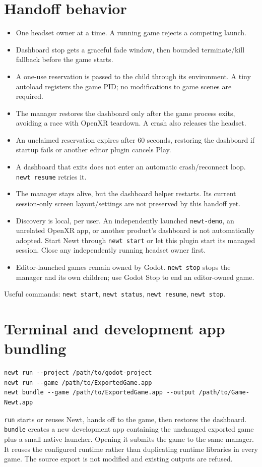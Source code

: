 \documentclass[11pt]{article}
\begin{document}
\section{Handoff behavior}
\label{sec:orgc7f6d77}
\begin{itemize}
\item One headset owner at a time. A running game rejects a competing launch.
\item Dashboard stop gets a graceful fade window, then bounded terminate/kill fallback before the game starts.
\item A one-use reservation is passed to the child through its environment. A tiny autoload registers the game PID; no modifications to game scenes are required.
\item The manager restores the dashboard only after the game process exits, avoiding a race with OpenXR teardown. A crash also releases the headset.
\item An unclaimed reservation expires after 60 seconds, restoring the dashboard if startup fails or another editor plugin cancels Play.
\item A dashboard that exits does not enter an automatic crash/reconnect loop. \texttt{newt resume} retries it.
\item The manager stays alive, but the dashboard helper restarts. Its current session-only screen layout/settings are not preserved by this handoff yet.
\item Discovery is local, per user. An independently launched \texttt{newt-demo}, an unrelated OpenXR app, or another product's dashboard is not automatically adopted. Start Newt through \texttt{newt start} or let this plugin start its managed session. Close any independently running headset owner first.
\item Editor-launched games remain owned by Godot. \texttt{newt stop} stops the manager and its own children; use Godot Stop to end an editor-owned game.
\end{itemize}

Useful commands: \texttt{newt start}, \texttt{newt status}, \texttt{newt resume}, \texttt{newt stop}.
\section{Terminal and development app bundling}
\label{sec:org80abfc4}
\begin{verbatim}
newt run --project /path/to/godot-project
newt run --game /path/to/ExportedGame.app
newt bundle --game /path/to/ExportedGame.app --output /path/to/Game-Newt.app
\end{verbatim}
\texttt{run} starts or reuses Newt, hands off to the game, then restores the dashboard. \texttt{bundle} creates a new development app containing the unchanged exported game plus a small native launcher. Opening it submits the game to the same manager. It reuses the configured runtime rather than duplicating runtime libraries in every game. The source export is not modified and existing outputs are refused.
\end{document}
